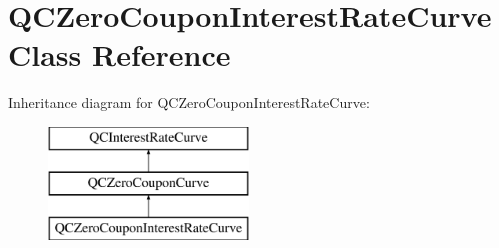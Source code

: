 \hypertarget{class_q_c_zero_coupon_interest_rate_curve}{\section{Q\+C\+Zero\+Coupon\+Interest\+Rate\+Curve Class Reference}
\label{class_q_c_zero_coupon_interest_rate_curve}
}
Inheritance diagram for Q\+C\+Zero\+Coupon\+Interest\+Rate\+Curve\+:\begin{figure}[H]
\begin{center}
\leavevmode
\includegraphics[height=3.000000cm]{class_q_c_zero_coupon_interest_rate_curve}
\end{center}
\end{figure}
